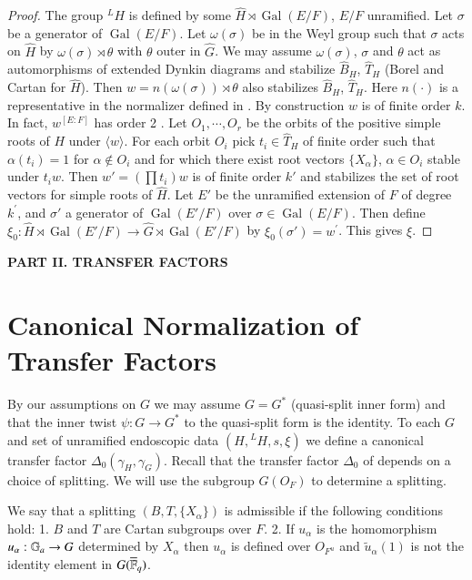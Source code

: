 \documentclass{amsart}
\newenvironment{cthm}[1]
  {\renewcommand\thethm{\bf #1}\thm}
  {\endthm}
\def\Gal{\operatorname{\text{Gal}}}          %
\def\LANGLANDSO{21}
\begin{document}
\begin{proof}  The group ${}^LH$ is
defined by some $\widehat H\rtimes\Gal(E/F)$,
$E/F$ unramified.  Let $\sigma$ be a generator of 
$\Gal(E/F)$.  Let $\omega(\sigma)$ be in the Weyl group such that
$\sigma$ acts on $\widehat H$ by $\omega(\sigma)\rtimes\theta$
with $\theta$ outer in $\widehat G$. We may assume
$\omega(\sigma)$, $\sigma$ and $\theta$ act as 
automorphisms of extended Dynkin diagrams and stabilize $\widehat B_H$,
$\widehat T_H$ (Borel and Cartan for $\widehat H$).  Then
$w=n(\omega(\sigma))\rtimes\theta$ also stabilizes $\widehat B_H$,
$\widehat T_H$.  Here $n(\cdot)$ is a representative in the normalizer
defined in \cite{\LANGLANDSO}.  By construction $w$
is of finite order $k$.  In fact, 
$w^{[E:F]}$ has order 2 \cite{\LANGLANDSO}.
Let $O_1,\cdots,O_r$ be the orbits
of the positive simple roots of $H$ under $\langle w\rangle$.
For each orbit $O_i$ pick $t_i\in \widehat T_H$ of finite order such that
$\alpha(t_i)=1$ for $\alpha\not\in O_i$ and for which there exist root
vectors $\{X_\alpha\}$, $\alpha\in O_i$ stable under $t_iw$.  Then
$w' = (\prod t_i)w$ is of finite order $k'$ and stabilizes the set of root vectors
for simple roots of $\widehat H$.  Let $E'$ be the unramified extension of $F$
of degree $k^\prime$, and $\sigma'$ a generator of $\Gal(E'/F)$ over $\sigma\in\Gal(E/F)$. 
Then define
$
\xi_0:\widehat H\rtimes\Gal(E'/F)
\to \widehat G\rtimes\Gal(E'/F)
$
by $\xi_0(\sigma') =w^\prime$.  This gives $\xi$.
\end{proof}
\vfil\eject 

\centerline{\bf PART II.  TRANSFER FACTORS}\bigskip

\section{Canonical Normalization of Transfer Factors} %

By our assumptions on $G$ we may assume $G=G^*$ (quasi-split
inner form) and that the inner twist $\psi:G\to G^*$ to the
quasi-split form is the identity.  To each $G$ and set
of unramified endoscopic data $(H,{}^LH,s,\xi)$ we define
a canonical transfer factor $\Delta_0(\gamma_H,\gamma_G)$.
Recall that the transfer factor $\Delta_0$ of \cite{\LANGLANDSO}
depends on a choice of splitting.  We will use the
subgroup $G(O_F)$ to determine a splitting.

\begin{cthm}{Definition 7.1}  We say that a splitting 
$(B,T,\{X_\alpha\})$ is admissible if the following conditions hold:
{1.}  $B$ and $T$ are Cartan subgroups over $F$.
{2.}  If $u_\alpha$ is the homomorphism
$u_\alpha:\Bbb G_a\to G$ determined by $X_\alpha$ then
$u_\alpha$ is defined over $O_{F^u}$ and $\tilde u_\alpha(1)$
is not the identity element in $G(\overline{\Bbb F}_q)$.
\end{cthm}
\end{document}
